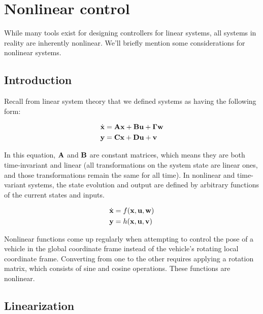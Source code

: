 
\chapter{Nonlinear control}
\label{ch:nonlinear_control}

While many tools exist for designing controllers for linear \glspl{system}, all
\glspl{system} in reality are inherently nonlinear. We'll briefly mention some
considerations for nonlinear \glspl{system}.

\section{Introduction}

Recall from linear \gls{system} theory that we defined \glspl{system} as having
the following form:

\begin{align*}
  \dot{\mathbf{x}} &= \mathbf{A}\mathbf{x} + \mathbf{B}\mathbf{u} + \mathbf{\Gamma}\mathbf{w} \\
  \mathbf{y} &= \mathbf{C}\mathbf{x} + \mathbf{D}\mathbf{u} + \mathbf{v}
\end{align*}

In this equation, $\mathbf{A}$ and $\mathbf{B}$ are constant matrices, which means
they are both time-invariant and linear (all transformations on the \gls{system}
\gls{state} are linear ones, and those transformations remain the same for all
time). In nonlinear and time-variant \glspl{system}, the \gls{state} evolution
and \gls{output} are defined by arbitrary functions of the current \glspl{state}
and \glspl{input}.

\begin{align*}
  \dot{\mathbf{x}} &= f(\mathbf{x}, \mathbf{u}, \mathbf{w}) \\
  \mathbf{y} &= h(\mathbf{x}, \mathbf{u}, \mathbf{v})
\end{align*}

Nonlinear functions come up regularly when attempting to control the \gls{pose}
of a vehicle in the global coordinate frame instead of the vehicle's rotating
local coordinate frame. Converting from one to the other requires applying a
rotation matrix, which consists of sine and cosine operations. These functions
are nonlinear.

\section{Linearization}

